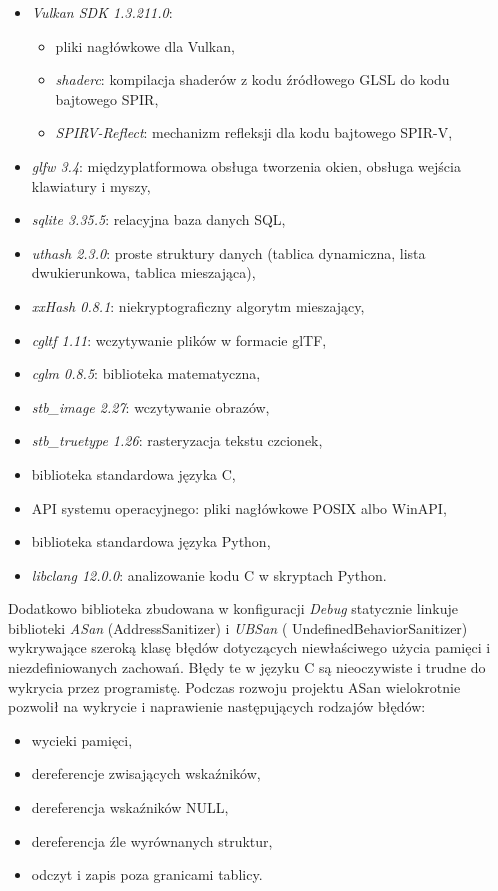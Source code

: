 \begin{itemize}
	\item {\textit{Vulkan SDK 1.3.211.0}}:
	\begin{itemize}
		\item pliki nagłówkowe dla Vulkan,
		\item \textit{shaderc}: kompilacja shaderów z kodu źródłowego GLSL do kodu bajtowego SPIR,
		\item \textit{SPIRV-Reflect}: mechanizm refleksji dla kodu bajtowego SPIR-V,
	\end{itemize}
	\item {\textit{glfw 3.4}}: międzyplatformowa obsługa tworzenia okien, obsługa wejścia klawiatury i myszy,
	\item {\textit{sqlite 3.35.5}}: relacyjna baza danych SQL,
	\item {\textit{uthash 2.3.0}}: proste struktury danych (tablica dynamiczna, lista dwukierunkowa, tablica mieszająca),
	\item {\textit{xxHash 0.8.1}}: niekryptograficzny algorytm mieszający,
	\item {\textit{cgltf 1.11}}: wczytywanie plików w formacie glTF,
	\item {\textit{cglm 0.8.5}}: biblioteka matematyczna,
	\item {\textit{stb\_image 2.27}}: wczytywanie obrazów,
	\item {\textit{stb\_truetype 1.26}}: rasteryzacja tekstu czcionek,
	\item {biblioteka standardowa języka C},
	\item {API systemu operacyjnego}: pliki nagłówkowe POSIX albo WinAPI,
	\item {biblioteka standardowa języka Python},
	\item {\textit{libclang 12.0.0}}: analizowanie kodu C w skryptach Python.
\end{itemize}

Dodatkowo biblioteka zbudowana w konfiguracji \textit{Debug} statycznie linkuje biblioteki \textit{ASan} (AddressSanitizer) i \textit{UBSan} (
UndefinedBehaviorSanitizer) wykrywające szeroką klasę błędów dotyczących niewłaściwego użycia pamięci i niezdefiniowanych zachowań. Błędy te w języku C są nieoczywiste i trudne do wykrycia przez programistę. Podczas rozwoju projektu ASan wielokrotnie pozwolił na wykrycie i naprawienie następujących rodzajów błędów:

\begin{itemize}
	\item wycieki pamięci,
	\item dereferencje zwisających wskaźników,
	\item dereferencja wskaźników NULL,
	\item dereferencja źle wyrównanych struktur,
	\item odczyt i zapis poza granicami tablicy.
\end{itemize}


